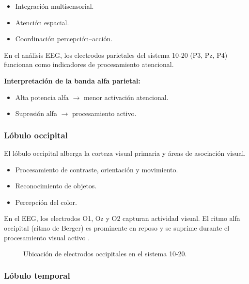 \documentclass{book}
\begin{document}
\begin{itemize}
    \item Integración multisensorial.
    \item Atención espacial.
    \item Coordinación percepción–acción.
\end{itemize}

En el análisis EEG, los electrodos parietales del sistema 10-20 (P3, Pz, P4) funcionan como indicadores de procesamiento atencional.

\textbf{Interpretación de la banda alfa parietal:}
\begin{itemize}
    \item Alta potencia alfa $\rightarrow$ menor activación atencional.
    \item Supresión alfa $\rightarrow$ procesamiento activo.
\end{itemize}

\subsubsection*{Lóbulo occipital}

El lóbulo occipital alberga la corteza visual primaria y áreas de asociación visual.

\begin{itemize}
    \item Procesamiento de contraste, orientación y movimiento.
    \item Reconocimiento de objetos.
    \item Percepción del color.
\end{itemize}

En el EEG, los electrodos O1, Oz y O2 capturan actividad visual. El ritmo alfa occipital (ritmo de Berger) es prominente en reposo y se suprime durante el procesamiento visual activo \cite{Klimesch1999}.

\begin{figure}[H]
\centering
{}
\caption{Ubicación de electrodos occipitales en el sistema 10-20.}
\label{fig:electrodos_occipitales}
\end{figure}

\subsubsection*{Lóbulo temporal}
\end{document}
